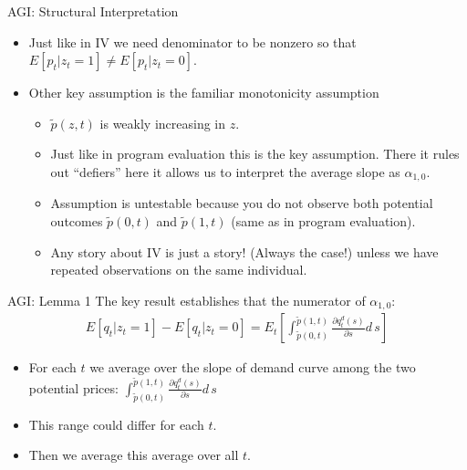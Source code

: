 \documentclass[xcolor=pdftex,dvipsnames,table,mathserif,aspectratio=169]{beamer}
\begin{document}
\begin{frame}{AGI: Structural Interpretation}
\begin{itemize}
\item Just like in IV we need denominator to be nonzero so that
$E[p_t | z_t=1] \neq E[p_t | z_t = 0]$.
\item Other key assumption is the familiar \alert{monotonicity} assumption
\begin{itemize}
\item $\tilde{p}(z,t)$ is weakly increasing in $z$.
\item Just like in program evaluation this is the key assumption. There it rules out ``defiers'' here it allows us to interpret the \alert{average slope} as $\alpha_{1,0}$.
\item Assumption is untestable because you do not observe both potential outcomes $\tilde{p}(0,t)$ and $\tilde{p}(1,t)$ (same as in program evaluation).
\item Any story about IV is just a story! (Always the case!) unless we have repeated observations on the same individual.
\end{itemize}
\end{itemize}
\end{frame}


\begin{frame}{AGI: Lemma 1}
The key result establishes that the numerator of $\alpha_{1,0}$:
\begin{eqnarray*}
E[q_t | z_t =1] - E[q_t | z_t = 0] = E_t \left[\int_{\tilde{p}(0,t)}^{\tilde{p}(1,t)} \frac{\partial q_t^d(s)}{\partial s}{d\, s} \right]
\end{eqnarray*}
\begin{itemize}
\item For each $t$ we average over the slope of demand curve among the two potential prices: $\int_{\tilde{p}(0,t)}^{\tilde{p}(1,t)} \frac{\partial q_t^d(s)}{\partial s}{d\, s}$ 
\item This range could differ for each $t$.
\item Then we average this average over all $t$.
\end{itemize}
\end{frame}
\end{document}
